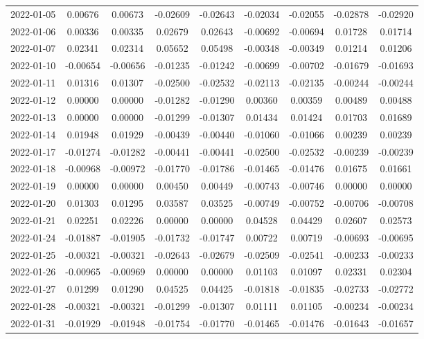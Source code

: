 {\begin{footnotesize}
\begin{longtable}{lcccccccc}
2022-01-05 & 0.00676 & 0.00673 & -0.02609 & -0.02643 & -0.02034 & -0.02055 & -0.02878 & -0.02920 \\
2022-01-06 & 0.00336 & 0.00335 & 0.02679 & 0.02643 & -0.00692 & -0.00694 & 0.01728 & 0.01714 \\
2022-01-07 & 0.02341 & 0.02314 & 0.05652 & 0.05498 & -0.00348 & -0.00349 & 0.01214 & 0.01206 \\
2022-01-10 & -0.00654 & -0.00656 & -0.01235 & -0.01242 & -0.00699 & -0.00702 & -0.01679 & -0.01693 \\
2022-01-11 & 0.01316 & 0.01307 & -0.02500 & -0.02532 & -0.02113 & -0.02135 & -0.00244 & -0.00244 \\
2022-01-12 & 0.00000 & 0.00000 & -0.01282 & -0.01290 & 0.00360 & 0.00359 & 0.00489 & 0.00488 \\
2022-01-13 & 0.00000 & 0.00000 & -0.01299 & -0.01307 & 0.01434 & 0.01424 & 0.01703 & 0.01689 \\
2022-01-14 & 0.01948 & 0.01929 & -0.00439 & -0.00440 & -0.01060 & -0.01066 & 0.00239 & 0.00239 \\
2022-01-17 & -0.01274 & -0.01282 & -0.00441 & -0.00441 & -0.02500 & -0.02532 & -0.00239 & -0.00239 \\
2022-01-18 & -0.00968 & -0.00972 & -0.01770 & -0.01786 & -0.01465 & -0.01476 & 0.01675 & 0.01661 \\
2022-01-19 & 0.00000 & 0.00000 & 0.00450 & 0.00449 & -0.00743 & -0.00746 & 0.00000 & 0.00000 \\
2022-01-20 & 0.01303 & 0.01295 & 0.03587 & 0.03525 & -0.00749 & -0.00752 & -0.00706 & -0.00708 \\
2022-01-21 & 0.02251 & 0.02226 & 0.00000 & 0.00000 & 0.04528 & 0.04429 & 0.02607 & 0.02573 \\
2022-01-24 & -0.01887 & -0.01905 & -0.01732 & -0.01747 & 0.00722 & 0.00719 & -0.00693 & -0.00695 \\
2022-01-25 & -0.00321 & -0.00321 & -0.02643 & -0.02679 & -0.02509 & -0.02541 & -0.00233 & -0.00233 \\
2022-01-26 & -0.00965 & -0.00969 & 0.00000 & 0.00000 & 0.01103 & 0.01097 & 0.02331 & 0.02304 \\
2022-01-27 & 0.01299 & 0.01290 & 0.04525 & 0.04425 & -0.01818 & -0.01835 & -0.02733 & -0.02772 \\
2022-01-28 & -0.00321 & -0.00321 & -0.01299 & -0.01307 & 0.01111 & 0.01105 & -0.00234 & -0.00234 \\
2022-01-31 & -0.01929 & -0.01948 & -0.01754 & -0.01770 & -0.01465 & -0.01476 & -0.01643 & -0.01657 \\

\end{longtable}
\end{footnotesize}}
